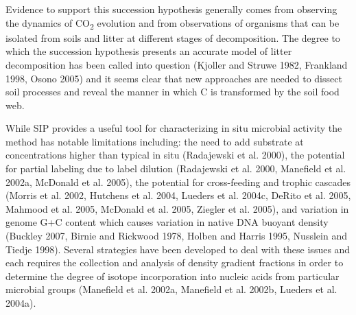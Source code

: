 Evidence to support this succession hypothesis generally comes from observing the dynamics of CO\textsubscript{2} evolution and from observations of organisms that can be isolated from soils and litter at different stages of decomposition. The degree to which the succession hypothesis presents an accurate model of litter decomposition has been called into question (Kjoller and Struwe 1982, Frankland 1998, Osono 2005) and it seems clear that new approaches are needed to dissect soil processes and reveal the manner in which C is transformed by the soil food web.



While SIP provides a useful tool for characterizing in situ microbial activity the method has notable limitations including: the need to add substrate at concentrations higher than typical in situ (Radajewski et al. 2000), the potential for partial labeling due to label dilution (Radajewski et al. 2000, Manefield et al. 2002a, McDonald et al. 2005), the potential for cross-feeding and trophic cascades (Morris et al. 2002, Hutchens et al. 2004, Lueders et al. 2004c, DeRito et al. 2005, Mahmood et al. 2005, McDonald et al. 2005, Ziegler et al. 2005), and variation in genome G+C content which causes variation in native DNA buoyant density (Buckley 2007, Birnie and Rickwood 1978, Holben and Harris 1995, Nusslein and Tiedje 1998). Several strategies have been developed to deal with these issues and each requires the collection and analysis of density gradient fractions in order to determine the degree of isotope incorporation into nucleic acids from particular microbial groups (Manefield et al. 2002a, Manefield et al. 2002b, Lueders et al. 2004a).

